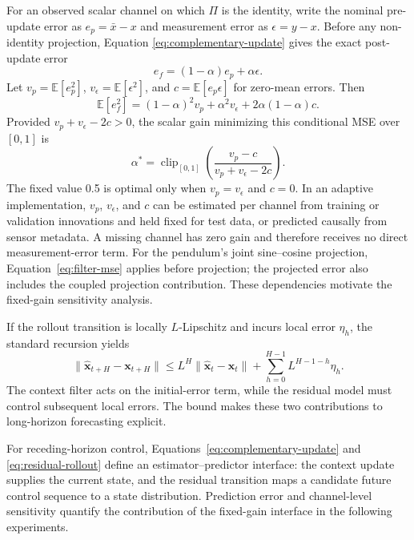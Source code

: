 \documentclass[iicol,pdflatex,sn-basic,Numbered]{sn-jnl}
\newcommand{\vect}[1]{\mathbf{#1}}
\begin{document}
For an observed scalar channel on which $\Pi$ is the identity, write the
nominal pre-update error as $e_p=\bar x-x$ and measurement error as
$\epsilon=y-x$. Before any non-identity projection, Equation
\eqref{eq:complementary-update} gives the exact post-update error
\begin{equation}
 e_f=(1-\alpha)e_p+\alpha\epsilon.
\end{equation}
Let $v_p=\mathbb E[e_p^2]$, $v_\epsilon=\mathbb E[\epsilon^2]$, and
$c=\mathbb E[e_p\epsilon]$ for zero-mean errors. Then
\begin{equation}
 \mathbb E[e_f^2]=(1-\alpha)^2v_p+\alpha^2v_\epsilon
 +2\alpha(1-\alpha)c.
 \label{eq:filter-mse}
\end{equation}
Provided $v_p+v_\epsilon-2c>0$, the scalar gain minimizing this conditional MSE
over $[0,1]$ is
\begin{equation}
 \alpha^*=\operatorname{clip}_{[0,1]}
 \left(\frac{v_p-c}{v_p+v_\epsilon-2c}\right).
 \label{eq:optimal-gain}
\end{equation}
The fixed value 0.5 is optimal only when $v_p=v_\epsilon$ and $c=0$. In an
adaptive implementation, $v_p$, $v_\epsilon$, and $c$ can be estimated per
channel from training or validation innovations and held fixed for test data,
or predicted causally from sensor metadata. A missing channel has zero gain and
therefore receives no direct measurement-error term. For the pendulum's joint sine--cosine projection,
Equation~\eqref{eq:filter-mse} applies before projection; the projected error
also includes the coupled projection contribution. These dependencies motivate
the fixed-gain sensitivity analysis.

If the rollout transition is locally $L$-Lipschitz and incurs local error
$\eta_h$, the standard recursion yields
\begin{equation}
 \|\hat{\vect x}_{t+H}-\vect x_{t+H}\|
 \le L^H\|\hat{\vect x}_t-\vect x_t\|
 +\sum_{h=0}^{H-1}L^{H-1-h}\eta_h.
\end{equation}
The context filter acts on the initial-error term, while the residual model
must control subsequent local errors. The bound makes these two contributions
to long-horizon forecasting explicit.

For receding-horizon control, Equations~\eqref{eq:complementary-update} and
\eqref{eq:residual-rollout} define an estimator--predictor interface: the
context update supplies the current state, and the residual transition maps a
candidate future control sequence to a state distribution. Prediction error
and channel-level sensitivity quantify the contribution of the fixed-gain
interface in the following experiments.
\end{document}
